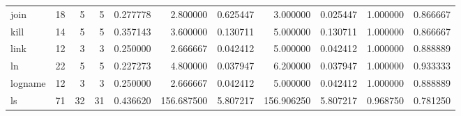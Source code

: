 \begin{longtable}{lrrrrrrrrrr}
join      &                                      18 &                  5 &                                 5 &                                   0.277778 &                               2.800000 &                                     0.625447 &                          3.000000 &                                0.025447 &                           1.000000 &                                           0.866667 \\
kill      &                                      14 &                  5 &                                 5 &                                   0.357143 &                               3.600000 &                                     0.130711 &                          5.000000 &                                0.130711 &                           1.000000 &                                           0.866667 \\
link      &                                      12 &                  3 &                                 3 &                                   0.250000 &                               2.666667 &                                     0.042412 &                          5.000000 &                                0.042412 &                           1.000000 &                                           0.888889 \\
ln        &                                      22 &                  5 &                                 5 &                                   0.227273 &                               4.800000 &                                     0.037947 &                          6.200000 &                                0.037947 &                           1.000000 &                                           0.933333 \\
logname   &                                      12 &                  3 &                                 3 &                                   0.250000 &                               2.666667 &                                     0.042412 &                          5.000000 &                                0.042412 &                           1.000000 &                                           0.888889 \\
ls        &                                      71 &                 32 &                                31 &                                   0.436620 &                             156.687500 &                                     5.807217 &                        156.906250 &                                5.807217 &                           0.968750 &                                           0.781250 \\

\end{longtable}
